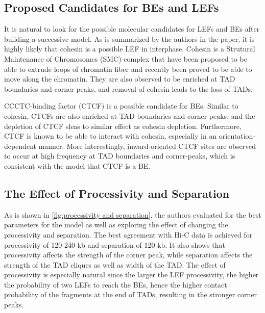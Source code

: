 \documentclass[11pt]{article}
\begin{document}
\subsection{Proposed Candidates for BEs and LEFs}

It is natural to look for the possible molecular candidates for LEFs and BEs after building a successive model. As is summarized by the authors in the paper, it is highly likely that cohesin is a possible LEF in interphase. Cohesin is a Strutural Maintenance of Chromosomes (SMC) complex that have been proposed to be able to extrude loops of chromatin fiber and recently been proved to be able to move along the chromatin. They are also observed to be enriched at TAD boundaries and corner peaks, and removal of cohesin leads to the loss of TADs.

CCCTC-binding factor (CTCF) is a possible candidate for BEs. Similar to cohesin, CTCFs are also enriched at TAD boundaries and corner peaks, and the depletion of CTCF sleas to similar effect as cohesin depletion. Furthermore, CTCF is known to be able to interact with cohesin, especially in an orientation-dependent manner. More interestingly, inward-oriented CTCF sites are observed to occur at high frequency at TAD boundaries and corner-peaks, which is consistent with the model that CTCF is a BE.

\subsection{The Effect of Processivity and Separation}

As is shown in \cref{fig:processivity and separation}, the authors evaluated for the best parameters for the model as well as exploring the effect of changing the processivity and separation. The best agreement with Hi-C data is achieved for processivity of 120-240 kb and separation of 120 kb. It also shows that processivity affects the strength of the corner peak, while separation affects the strength of the TAD cliques as well as width of the TAD. The effect of processivity is especially natural since the larger the LEF processivity, the higher the probability of two LEFs to reach the BEs, hence the higher contact probability of the fragments at the end of TADs, resulting in the stronger corner peaks.
\end{document}
